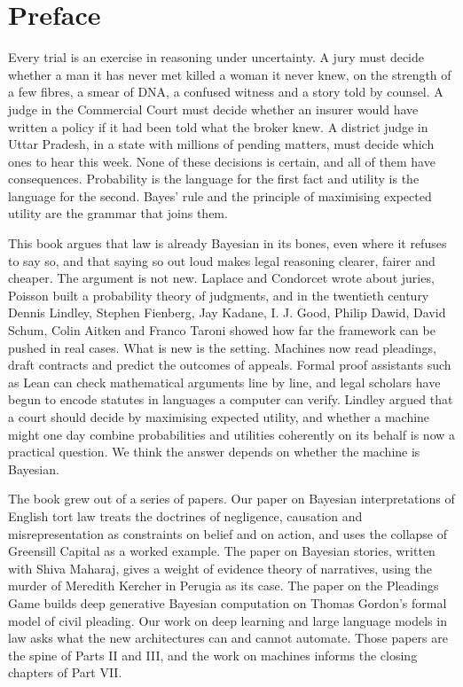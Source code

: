 \chapter*{Preface}

Every trial is an exercise in reasoning under uncertainty. A jury must decide whether a man it has never met killed a woman it never knew, on the strength of a few fibres, a smear of DNA, a confused witness and a story told by counsel. A judge in the Commercial Court must decide whether an insurer would have written a policy if it had been told what the broker knew. A district judge in Uttar Pradesh, in a state with millions of pending matters, must decide which ones to hear this week. None of these decisions is certain, and all of them have consequences. Probability is the language for the first fact and utility is the language for the second. Bayes' rule and the principle of maximising expected utility are the grammar that joins them.

This book argues that law is already Bayesian in its bones, even where it refuses to say so, and that saying so out loud makes legal reasoning clearer, fairer and cheaper. The argument is not new. Laplace and Condorcet wrote about juries, Poisson built a probability theory of judgments, and in the twentieth century Dennis Lindley, Stephen Fienberg, Jay Kadane, I. J. Good, Philip Dawid, David Schum, Colin Aitken and Franco Taroni showed how far the framework can be pushed in real cases. What is new is the setting. Machines now read pleadings, draft contracts and predict the outcomes of appeals. Formal proof assistants such as Lean can check mathematical arguments line by line, and legal scholars have begun to encode statutes in languages a computer can verify. Lindley argued that a court should decide by maximising expected utility, and whether a machine might one day combine probabilities and utilities coherently on its behalf is now a practical question. We think the answer depends on whether the machine is Bayesian.

The book grew out of a series of papers. Our paper on Bayesian interpretations of English tort law treats the doctrines of negligence, causation and misrepresentation as constraints on belief and on action, and uses the collapse of Greensill Capital as a worked example. The paper on Bayesian stories, written with Shiva Maharaj, gives a weight of evidence theory of narratives, using the murder of Meredith Kercher in Perugia as its case. The paper on the Pleadings Game builds deep generative Bayesian computation on Thomas Gordon's formal model of civil pleading. Our work on deep learning and large language models in law asks what the new architectures can and cannot automate. Those papers are the spine of Parts II and III, and the work on machines informs the closing chapters of Part VII.

